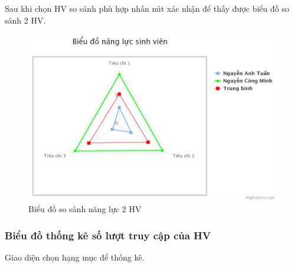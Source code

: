 Sau khi chọn HV so sánh phù hợp nhấn nút xác nhận để thấy được biểu đồ so sánh 2 HV.
\begin{center}
	\begin{figure}[htp]
		\begin{center}
			\includegraphics[width=0.8\linewidth]{img/25}
		\end{center}
		\caption{Biểu đồ so sánh năng lực 2 HV}
		\label{refhinh57}
	\end{figure}
\end{center}


\newpage
\subsubsection*{Biểu đồ thống kê số lượt truy cập của HV}

Giao diện chọn hạng mục để thống kê.

